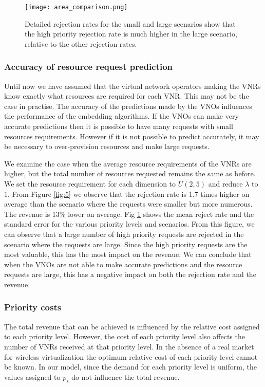 \documentclass[conference]{IEEEtran}
\begin{document}
\begin{figure}[!t]
\centering
   \texttt{[image: area\_comparison.png]}\hfill
  \caption{{Detailed rejection rates for the small and large scenarios show that the high priority rejection rate is much higher in the large scenario, relative to the other rejection rates.}}\label{fig:6}
\end{figure}

\subsubsection{Accuracy of resource request prediction}
Until now we have assumed that the virtual network operators making the VNRs know exactly what resources are required for each VNR. This may not be the case in practise. The accuracy of the predictions made by the VNOs influences the performance of the embedding algorithms. If the VNOs can make very accurate predictions then it is possible to have many requests with small resources requirements. However if it is not possible to predict accurately, it may be necessary to over-provision resources and make large requests.

We examine the case when the average resource requirements of the VNRs are higher, but the total number of resources requested remains the same as before. We set the resource requirement for each dimension to $U(2, 5)$ and reduce $\lambda$ to $1$. From Figure \ref{fig:5} we observe that the rejection rate is 1.7 times higher on average than the scenario where the requests were smaller but more numerous. The revenue is 13\% lower on average.  Fig \ref{fig:6} shows the mean reject rate and the standard error for the various priority levels and scenarios. From this figure, we can observe that a large number of high priority requests are rejected in the scenario where the requests are large. Since the high priority requests are the most valuable, this has the most impact on the revenue. We can conclude that when the VNOs are not able to make accurate predictions and the resource requests are large, this has a negative impact on both the rejection rate and the revenue.

\subsubsection{Priority costs}
The total revenue that can be achieved is influenced by the relative cost assigned to each priority level. However, the cost of each priority level also affects the number of VNRs received at that priority level. In the absence of a real market for wireless virtualization the optimum relative cost of each priority level cannot be known. In our model, since the demand for each priority level is uniform, the values assigned to $p_s$ do not influence the total revenue.
\end{document}
